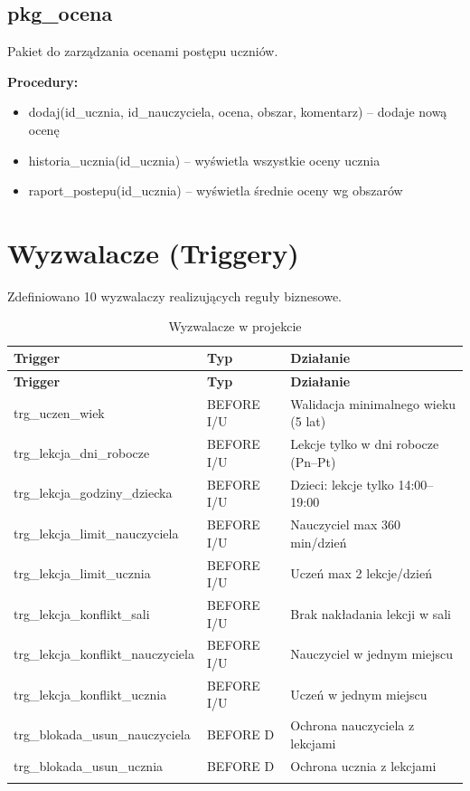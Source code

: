 \documentclass[12pt,a4paper]{article}
\begin{document}
\subsection{pkg\_ocena}

Pakiet do zarządzania ocenami postępu uczniów.

\textbf{Procedury:}
\begin{itemize}[nosep]
    \item dodaj(id\_ucznia, id\_nauczyciela, ocena, obszar, komentarz) -- dodaje nową ocenę
    \item historia\_ucznia(id\_ucznia) -- wyświetla wszystkie oceny ucznia
    \item raport\_postepu(id\_ucznia) -- wyświetla średnie oceny wg obszarów
\end{itemize}

\section{Wyzwalacze (Triggery)}

Zdefiniowano 10 wyzwalaczy realizujących reguły biznesowe.

\begin{longtable}{|l|l|p{6cm}|}
\hline
\textbf{Trigger} & \textbf{Typ} & \textbf{Działanie} \\
\hline
\endfirsthead
\hline
\textbf{Trigger} & \textbf{Typ} & \textbf{Działanie} \\
\hline
\endhead
trg\_uczen\_wiek & BEFORE I/U & Walidacja minimalnego wieku (5 lat) \\
\hline
trg\_lekcja\_dni\_robocze & BEFORE I/U & Lekcje tylko w dni robocze (Pn--Pt) \\
\hline
trg\_lekcja\_godziny\_dziecka & BEFORE I/U & Dzieci: lekcje tylko 14:00--19:00 \\
\hline
trg\_lekcja\_limit\_nauczyciela & BEFORE I/U & Nauczyciel max 360 min/dzień \\
\hline
trg\_lekcja\_limit\_ucznia & BEFORE I/U & Uczeń max 2 lekcje/dzień \\
\hline
trg\_lekcja\_konflikt\_sali & BEFORE I/U & Brak nakładania lekcji w sali \\
\hline
trg\_lekcja\_konflikt\_nauczyciela & BEFORE I/U & Nauczyciel w jednym miejscu \\
\hline
trg\_lekcja\_konflikt\_ucznia & BEFORE I/U & Uczeń w jednym miejscu \\
\hline
trg\_blokada\_usun\_nauczyciela & BEFORE D & Ochrona nauczyciela z lekcjami \\
\hline
trg\_blokada\_usun\_ucznia & BEFORE D & Ochrona ucznia z lekcjami \\
\hline
\caption{Wyzwalacze w projekcie}
\end{longtable}
\end{document}
